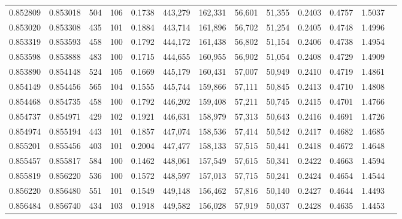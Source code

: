 \begin{tabular}{rrrrrrrrrrrrr}
0.852809 & 0.853018 &   504 & 106 &                                     0.1738 & 443,279 & 162,331 &  56,601 &  51,355 & 0.2403 & 0.4757 & 1.5037 \\
0.853020 & 0.853308 &   435 & 101 &                                     0.1884 & 443,714 & 161,896 &  56,702 &  51,254 & 0.2405 & 0.4748 & 1.4996 \\
0.853319 & 0.853593 &   458 & 100 &                                     0.1792 & 444,172 & 161,438 &  56,802 &  51,154 & 0.2406 & 0.4738 & 1.4954 \\
0.853598 & 0.853888 &   483 & 100 &                                     0.1715 & 444,655 & 160,955 &  56,902 &  51,054 & 0.2408 & 0.4729 & 1.4909 \\
0.853890 & 0.854148 &   524 & 105 &                                     0.1669 & 445,179 & 160,431 &  57,007 &  50,949 & 0.2410 & 0.4719 & 1.4861 \\
0.854149 & 0.854456 &   565 & 104 &                                     0.1555 & 445,744 & 159,866 &  57,111 &  50,845 & 0.2413 & 0.4710 & 1.4808 \\
0.854468 & 0.854735 &   458 & 100 &                                     0.1792 & 446,202 & 159,408 &  57,211 &  50,745 & 0.2415 & 0.4701 & 1.4766 \\
0.854737 & 0.854971 &   429 & 102 &                                     0.1921 & 446,631 & 158,979 &  57,313 &  50,643 & 0.2416 & 0.4691 & 1.4726 \\
0.854974 & 0.855194 &   443 & 101 &                                     0.1857 & 447,074 & 158,536 &  57,414 &  50,542 & 0.2417 & 0.4682 & 1.4685 \\
0.855201 & 0.855456 &   403 & 101 &                                     0.2004 & 447,477 & 158,133 &  57,515 &  50,441 & 0.2418 & 0.4672 & 1.4648 \\
0.855457 & 0.855817 &   584 & 100 &                                     0.1462 & 448,061 & 157,549 &  57,615 &  50,341 & 0.2422 & 0.4663 & 1.4594 \\
0.855819 & 0.856220 &   536 & 100 &                                     0.1572 & 448,597 & 157,013 &  57,715 &  50,241 & 0.2424 & 0.4654 & 1.4544 \\
0.856220 & 0.856480 &   551 & 101 &                                     0.1549 & 449,148 & 156,462 &  57,816 &  50,140 & 0.2427 & 0.4644 & 1.4493 \\
0.856484 & 0.856740 &   434 & 103 &                                     0.1918 & 449,582 & 156,028 &  57,919 &  50,037 & 0.2428 & 0.4635 & 1.4453 \\

\end{tabular}
